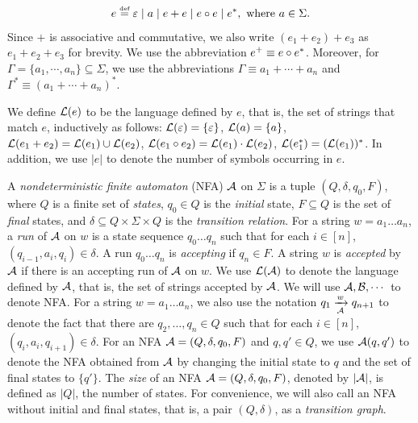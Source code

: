 \begin{definition}
	\[e \eqdef \varepsilon \mid a \mid e + e \mid e \concat e \mid e^*, \mbox{ where } a \in \Sigma. \]
	Since $+$ is associative and commutative, we also write $(e_1 + e_2) + e_3$ as $e_1 + e_2 + e_3$ for brevity. We use the abbreviation $e^+ \equiv e \circ e^*$. Moreover, for $\Gamma = \{a_1, \cdots, a_n\}\subseteq \Sigma$, we use the abbreviations $\Gamma \equiv a_1 + \cdots + a_n$ and $\Gamma^\ast \equiv (a_1 + \cdots + a_n)^\ast$. 
\end{definition}
We define $\mathcal{L}(e)$ to be the language defined by $e$, that is, the set of strings that match $e$, inductively as follows: 
$\mathcal{L}(\varepsilon) =\{\varepsilon\}$,
%
$\mathcal{L}(a)= \{a\}$,
%
$\mathcal{L}(e_1 + e_2) = \mathcal{L}(e_1) \cup \mathcal{L}(e_2)$,
%
$\mathcal{L}(e_1 \circ e_2) = \mathcal{L}(e_1) \cdot \mathcal{L}(e_2)$,
%
$\mathcal{L}(e_1^*)=(\mathcal{L}(e_1))^*$.
In addition, we use $|e|$ to denote the number of symbols occurring in $e$.

A \emph{nondeterministic finite automaton} (NFA) $\mathcal{A}$ on $\Sigma$ is a tuple $(Q, \delta, q_0, F)$, where $Q$ is a finite set of \emph{states}, $q_0 \in Q$ is the \emph{initial} state, $F \subseteq Q$ is the set of \emph{final} states, and $\delta \subseteq Q \times \Sigma \times Q$ is the \emph{transition relation}. For a string $w = a_1 \dots a_n$, a \emph{run} of $\mathcal{A}$ on $w$ is a state sequence $q_0 \dots q_n$ such that for each $i \in [n]$, $(q_{i-1}, a_i, q_i) \in \delta$. A run $q_0 \dots q_n$ is \emph{accepting} if $q_n \in F$. A string $w$ is \emph{accepted} by $\mathcal{A}$ if there is an accepting run of $\mathcal{A}$ on $w$. We use $\mathcal{L}(\mathcal{A})$ to denote the language defined by $\mathcal{A}$, that is, the set of strings accepted by $\mathcal{A}$. We will use $\mathcal{A}, \mathcal{B}, \cdots$ to denote NFA. 
For a string $w= a_1 \dots a_n$, we also use the notation $q_1 \xrightarrow[\mathcal{A}]{w} q_{n+1}$ to denote the fact that there are $q_2,\dots, q_n \in Q$ such that for each $i \in [n]$, $(q_i, a_i, q_{i+1}) \in \delta$.  For an NFA $\mathcal{A}=(Q, \delta, q_0, F)$ and $q, q' \in Q$, we use $\mathcal{A}(q,q')$ to denote the NFA obtained from $\mathcal{A}$ by changing the initial state to $q$ and the set of final states to $\{q'\}$. The \emph{size} of an NFA $\mathcal{A}=(Q, \delta, q_0, F)$, denoted by $|\mathcal{A}|$, is defined as $|Q|$, the number of states. For convenience, we will also call an NFA without initial and final states, that is, a pair $(Q, \delta)$, as a \emph{transition graph}. 


